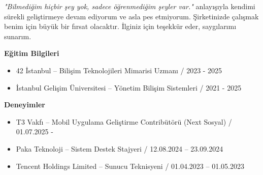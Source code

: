 \documentclass[a4paper,11pt]{article}
\begin{document}
\textit{"Bilmediğim hiçbir şey yok, sadece öğrenmediğim şeyler var."} anlayışıyla kendimi sürekli geliştirmeye devam ediyorum ve asla pes etmiyorum. Şirketinizde çalışmak benim için büyük bir fırsat olacaktır. İlginiz için teşekkür eder, saygılarımı sunarım.

\vspace{0.4em}

\textbf{Eğitim Bilgileri}
\vspace{-0.2em}
\begin{itemize}[leftmargin=2em]
  \item 42 İstanbul – Bilişim Teknolojileri Mimarisi Uzmanı / 2023 - 2025
  \item İstanbul Gelişim Üniversitesi – Yönetim Bilişim Sistemleri / 2021 - 2025
\end{itemize}

\vspace{-0.1em}

\textbf{Deneyimler}
\vspace{-0.2em}
\begin{itemize}[leftmargin=2em]
  \item T3 Vakfı – Mobil Uygulama Geliştirme Contribütörü (Next Sosyal) / 01.07.2025 -
  \item Paka Teknoloji – Sistem Destek Stajyeri / 12.08.2024 – 23.09.2024
  \item Tencent Holdings Limited – Sunucu Teknisyeni / 01.04.2023 – 01.05.2023
\end{itemize}

\vspace{0.1em}
\end{document}
